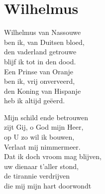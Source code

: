 \section{Wilhelmus}
Wilhelmus van Nassouwe \\
ben ik, van Duitsen bloed, \\
den vaderland getrouwe \\
blijf ik tot in den dood.\\
Een Prinse van Oranje\\
ben ik, vrij onverveerd,\\
den Koning van Hispanje\\
heb ik altijd geëerd.

Mijn schild ende betrouwen\\
zijt Gij, o God mijn Heer,\\
op U zo wil ik bouwen,\\
Verlaat mij nimmermeer.\\
Dat ik doch vroom mag blijven,\\
uw dienaar t'aller stond,\\
de tirannie verdrijven\\
die mij mijn hart doorwondt
